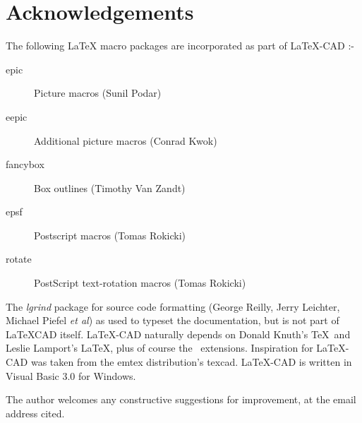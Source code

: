 \documentclass[a4paper]{article}
\begin{document}
\section{ Acknowledgements }
The following \LaTeX\/ macro packages are incorporated as part of
LaTeX-CAD :-
\begin{description}
	\item[epic] Picture macros (Sunil Podar)
	\item[eepic] Additional picture macros (Conrad Kwok)
	\item[fancybox] Box outlines (Timothy Van Zandt)
	\item[epsf] Postscript macros (Tomas Rokicki)
	\item[rotate] PostScript text-rotation macros (Tomas Rokicki)
\end{description}

The \textit{lgrind} package for source code formatting
(George Reilly, Jerry Leichter, Michael Piefel \textit{et al})
as used to typeset the documentation, but is not part of LaTeXCAD itself.
LaTeX-CAD naturally depends on Donald Knuth's \TeX\ and
Leslie Lamport's \LaTeX\/, plus of course the \LaTeXe\ extensions. 
Inspiration for LaTeX-CAD was taken from the emtex distribution's texcad. 
LaTeX-CAD is written in Visual Basic 3.0 for Windows. 

The author welcomes any constructive suggestions for improvement,
at the email address cited.
\end{document}
